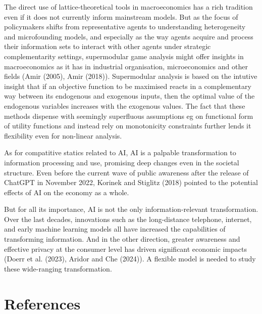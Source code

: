 \documentclass[
]{article}
\theoremstyle{plain}
\theoremstyle{definition}
\theoremstyle{remark}
\begin{document}
The direct use of lattice-theoretical tools in macroeconomics has a rich
tradition even if it does not currently inform mainstream models. But as
the focus of policymakers shifts from representative agents to
understanding heterogeneity and microfounding models, and especially as
the way agents acquire and process their information sets to interact
with other agents under strategic complementarity settings, supermodular
game analysis might offer insights in macroeconomics as it has in
industrial organisation, microeconomics and other fields (Amir (2005),
Amir (2018)). Supermodular analysis is based on the intutive insight
that if an objective function to be maximised reacts in a complementary
way between its endogenous and exogenous inputs, then the optimal value
of the endogenous variables increases with the exogenous values. The
fact that these methods dispense with seemingly superfluous assumptions
eg on functional form of utility functions and instead rely on
monotonicity constraints further lends it flexibility even for
non-linear analysis.

As for compatitive statics related to AI, AI is a palpable
transformation to information processing and use, promising deep changes
even in the societal structure. Even before the current wave of public
awareness after the release of ChatGPT in November 2022, Korinek and
Stiglitz (2018) pointed to the potential effects of AI on the economy as
a whole.

But for all its importance, AI is not the only information-relevant
transformation. Over the last decades, innovations such as the
long-distance telephone, internet, and early machine learning models all
have increased the capabilities of transforming information. And in the
other direction, greater awareness and effective privacy at the consumer
level has driven significant economic impacts (Doerr et al. (2023),
Aridor and Che (2024)). A flexible model is needed to study these
wide-ranging transformation.

\section{References}\label{references}
\end{document}
